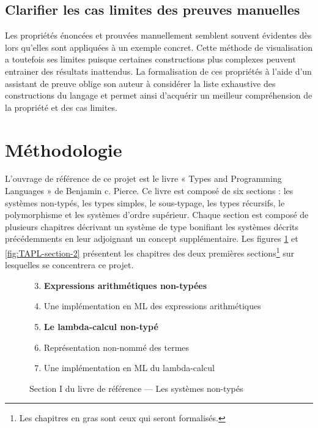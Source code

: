 \documentclass[a4paper, oneside, 12pt, titlepage, draft]{article}
\begin{document}
\subsection{Clarifier les cas limites des preuves manuelles}

Les propriétés énoncées et prouvées manuellement semblent souvent évidentes dès lors qu'elles sont
appliquées à un exemple concret. Cette méthode de visualisation a toutefois ses limites puisque
certaines constructions plus complexes peuvent entrainer des résultats inattendus. La formalisation
de ces propriétés à l'aide d'un assistant de preuve oblige son auteur à considérer la liste
exhaustive des constructions du langage et permet ainsi d'acquérir un meilleur compréhension de la
propriété et des cas limites.

\section{Méthodologie}

%

L'ouvrage de référence de ce projet est le livre « Types and Programming Languages » de Benjamin c.
Pierce. Ce livre est composé de six sections : les systèmes non-typés, les types simples, le
sous-typage, les types récursifs, le polymorphisme et les systèmes d'ordre supérieur. Chaque section
est composé de plusieurs chapitres décrivant un système de type bonifiant les systèmes décrits
précédemments en leur adjoignant un concept supplémentaire. Les figures \ref{fig:TAPL-section-1} et
\ref{fig:TAPL-section-2} présentent les chapitres des deux premières sections\footnote{Les chapitres
en gras sont ceux qui seront formalisés.} sur lesquelles se concentrera ce projet.


\begin{figure}[h]
  \begin{center}
    \begin{enumerate}[label=§\arabic*]
        \setcounter{enumi}{2}
      \item \textbf{Expressions arithmétiques non-typées}
      \item Une implémentation en ML des expressions arithmétiques
      \item \textbf{Le lambda-calcul non-typé}
      \item Représentation non-nommé des termes
      \item Une implémentation en ML du lambda-calcul
    \end{enumerate}
  \end{center}
  \caption{Section I du livre de référence --- Les systèmes non-typés}
  \label{fig:TAPL-section-1}
\end{figure}
\end{document}
